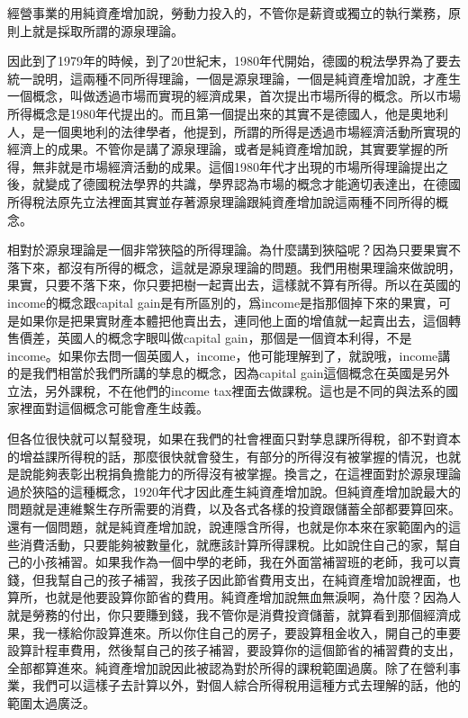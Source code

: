 \documentclass[]{ctexbook}
\begin{document}
經營事業的用純資產增加說，勞動力投入的，不管你是薪資或獨立的執行業務，原則上就是採取所謂的源泉理論。

因此到了1979年的時候，到了20世紀末，1980年代開始，德國的稅法學界為了要去統一說明，這兩種不同所得理論，一個是源泉理論，一個是純資產增加說，才產生一個概念，叫做透過市場而實現的經濟成果，首次提出市場所得的概念。所以市場所得概念是1980年代提出的。而且第一個提出來的其實不是德國人，他是奧地利人，是一個奧地利的法律學者，他提到，所謂的所得是透過市場經濟活動所實現的經濟上的成果。不管你是講了源泉理論，或者是純資產增加說，其實要掌握的所得，無非就是市場經濟活動的成果。這個1980年代才出現的市場所得理論提出之後，就變成了德國稅法學界的共識，學界認為市場的概念才能適切表達出，在德國所得稅法原先立法裡面其實並存著源泉理論跟純資產增加說這兩種不同所得的概念。

相對於源泉理論是一個非常狹隘的所得理論。為什麼講到狹隘呢？因為只要果實不落下來，都沒有所得的概念，這就是源泉理論的問題。我們用樹果理論來做說明，果實，只要不落下來，你只要把樹一起賣出去，這樣就不算有所得。所以在英國的income的概念跟capital gain是有所區別的，爲income是指那個掉下來的果實，可是如果你是把果實財產本體把他賣出去，連同他上面的增值就一起賣出去，這個轉售價差，英國人的概念字眼叫做capital gain，那個是一個資本利得，不是income。如果你去問一個英國人，income，他可能理解到了，就說哦，income講的是我們相當於我們所講的孳息的概念，因為capital gain這個概念在英國是另外立法，另外課稅，不在他們的income tax裡面去做課稅。這也是不同的與法系的國家裡面對這個概念可能會產生歧義。

但各位很快就可以幫發現，如果在我們的社會裡面只對孳息課所得稅，卻不對資本的增益課所得稅的話，那麼很快就會發生，有部分的所得沒有被掌握的情況，也就是說能夠表彰出稅捐負擔能力的所得沒有被掌握。換言之，在這裡面對於源泉理論過於狹隘的這種概念，1920年代才因此產生純資產增加說。但純資產增加說最大的問題就是連維繫生存所需要的消費，以及各式各樣的投資跟儲蓄全部都要算回來。還有一個問題，就是純資產增加說，說連隱含所得，也就是你本來在家範圍內的這些消費活動，只要能夠被數量化，就應該計算所得課稅。比如說住自己的家，幫自己的小孩補習。如果我作為一個中學的老師，我在外面當補習班的老師，我可以賣錢，但我幫自己的孩子補習，我孩子因此節省費用支出，在純資產增加說裡面，也算所，也就是他要設算你節省的費用。純資產增加說無血無淚啊，為什麼？因為人就是勞務的付出，你只要賺到錢，我不管你是消費投資儲蓄，就算看到那個經濟成果，我一樣給你設算進來。所以你住自己的房子，要設算租金收入，開自己的車要設算計程車費用，然後幫自己的孩子補習，要設算你的這個節省的補習費的支出，全部都算進來。純資產增加說因此被認為對於所得的課稅範圍過廣。除了在營利事業，我們可以這樣子去計算以外，對個人綜合所得稅用這種方式去理解的話，他的範圍太過廣泛。
\end{document}
